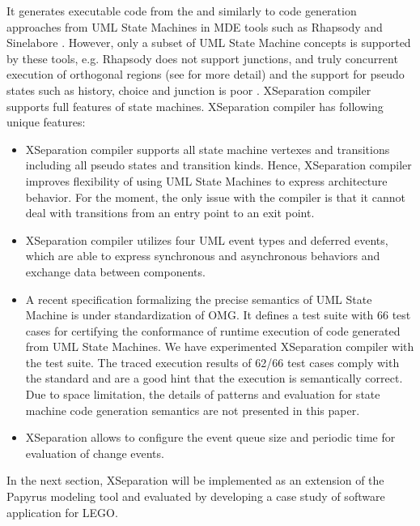\vskip 0.1cm
\noindent
{}
It generates executable code from the  and  similarly to code generation approaches from UML State Machines in MDE tools such as Rhapsody and Sinelabore \cite{sinelabore}.
However, only a subset of UML State Machine concepts is supported by these tools, e.g. Rhapsody does not support junctions, and truly concurrent execution of orthogonal regions
\cite{ibmdiff} (see \cite{specification_uml_2007} for more detail) and the support for pseudo states such as history, choice and junction is poor \cite{EA, sinelabore}. 
XSeparation compiler supports full features of state machines.
XSeparation compiler has following unique features:
\begin{itemize}[\footnotesize]
	\item {} XSeparation compiler supports all state machine vertexes and transitions including all pseudo states and transition kinds. 
	Hence, XSeparation compiler improves flexibility of using UML State Machines to express architecture behavior.
	For the moment, the only issue with the compiler is that it cannot deal with transitions from an entry point to an exit point.
	
	\item {} XSeparation compiler utilizes four UML event types and deferred events, which are able to express synchronous and asynchronous behaviors and exchange data between components.
	
	\item {} A recent specification formalizing the precise semantics of UML State Machine is under standardization of OMG.
	It defines a test suite with 66 test cases for certifying the conformance of runtime execution of code generated from UML State Machines.
	We have experimented XSeparation compiler with the test suite.
	The traced execution results of 62/66 test cases comply with the standard and are a good hint that the execution is semantically correct.
	Due to space limitation, the details of patterns and evaluation for state machine code generation semantics are not presented in this paper.
	
	\item {} XSeparation allows to configure the event queue size and periodic time for evaluation of change events.
\end{itemize}


In the next section, XSeparation will be implemented as an extension of the Papyrus modeling tool and evaluated by developing a case study of software application for LEGO.